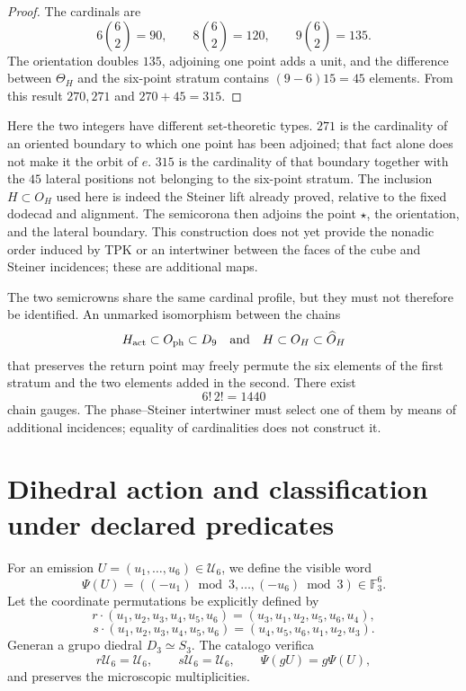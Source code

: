 \begin{proof}
The cardinals are
\[
 6\binom62=90,
 \qquad
 8\binom62=120,
 \qquad
 9\binom62=135.
\]
The orientation doubles \(135\), adjoining one point adds a unit, and
the difference between \(\Theta_H\) and the six-point stratum contains
\((9-6)15=45\) elements. From this result \(270,271\) and
\(270+45=315\).
\end{proof}

Here the two integers have different set-theoretic types. \(271\) is the
cardinality of an oriented boundary to which one point has been adjoined; that
fact alone does not make it the orbit of \(e\). \(315\) is the cardinality of that
boundary together with the \(45\) lateral positions not belonging to the
six-point stratum. The inclusion \(H\subset O_H\) used here is indeed the
Steiner lift already proved, relative to the fixed dodecad and alignment. The
semicorona then adjoins the point \(\star\), the orientation, and the lateral
boundary. This construction does not yet provide the nonadic order induced by
TPK or an intertwiner between the faces of the cube and Steiner incidences;
these are additional maps.

The two semicrowns share the same cardinal profile, but they must not
therefore be identified. An unmarked isomorphism between the chains
\[
 H_{\rm act}\subset O_{\rm ph}\subset D_9
 \quad\text{and}\quad
 H\subset O_H\subset\widehat O_H
\]
that preserves the return point may freely permute the six elements of the first stratum and the two elements added in the second. There exist
\[
 \boxed{6!\,2!=1440}
\]
chain gauges. The phase--Steiner intertwiner must select one of
them by means of additional incidences; equality of cardinalities does not
construct it.

\section{Dihedral action and classification under declared predicates}

For an emission
\(U=(u_1,\ldots,u_6)\in\mathcal U_6\), we define the visible word
\[
 \Psi(U)=((-u_1)\bmod3,\ldots,(-u_6)\bmod3)
 \in\mathbb F_3^6.
\]
Let the coordinate permutations be explicitly defined by
\[
 r\cdot(u_1,u_2,u_3,u_4,u_5,u_6)
 =(u_3,u_1,u_2,u_5,u_6,u_4),
\]
\[
 s\cdot(u_1,u_2,u_3,u_4,u_5,u_6)
 =(u_4,u_5,u_6,u_1,u_2,u_3).
\]
Generan
a grupo diedral \(D_3\simeq S_3\). The catalogo verifica
\[
 r\mathcal U_6=\mathcal U_6,
 \qquad
 s\mathcal U_6=\mathcal U_6,
 \qquad
 \Psi(gU)=g\Psi(U),
\]
and preserves the microscopic multiplicities.

